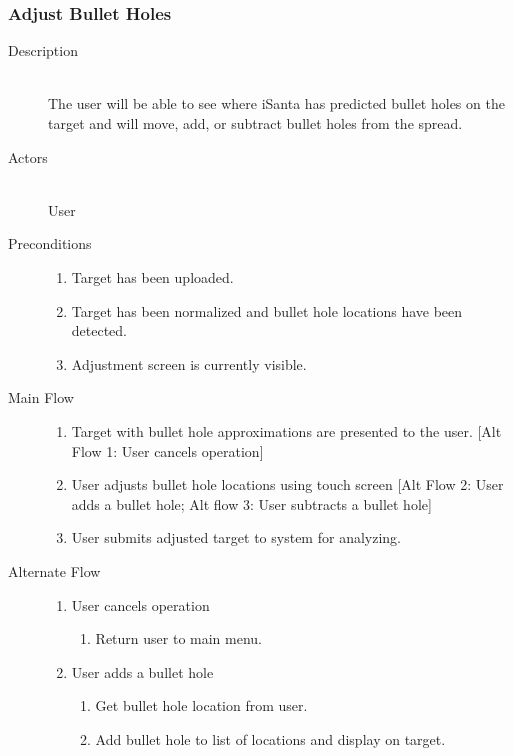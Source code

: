 \subsubsection{Adjust Bullet Holes}
\begin{description}
    \item[Description] \hfill \\
        The user will be able to see where iSanta has predicted bullet holes on the target and will move, add, or subtract bullet holes from the spread.
    \item[Actors] \hfill \\
        User
    \item[Preconditions] \hfill 
        \begin{enumerate}
            \item Target has been uploaded.
            \item Target has been normalized and bullet hole locations have been detected.
            \item Adjustment screen is currently visible.
        \end{enumerate}
    \item[Main Flow] \hfill 
        \begin{enumerate}
            \item Target with bullet hole approximations are presented to the user.
                [Alt Flow 1: User cancels operation]
            \item User adjusts bullet hole locations using touch screen 
                [Alt Flow 2: User adds a bullet hole; 
                Alt flow 3: User subtracts a bullet hole]
            \item User submits adjusted target to system for analyzing. 
        \end{enumerate}
    \item[Alternate Flow] \hfill 
        \begin{enumerate}
            \item User cancels operation 
                \begin{enumerate}
                    \item Return user to main menu. 
                \end{enumerate}
            \item User adds a bullet hole
                \begin{enumerate}
                    \item Get bullet hole location from user.
                    \item Add bullet hole to list of locations and display on target.

\end{enumerate}
\end{enumerate}
\end{description}
